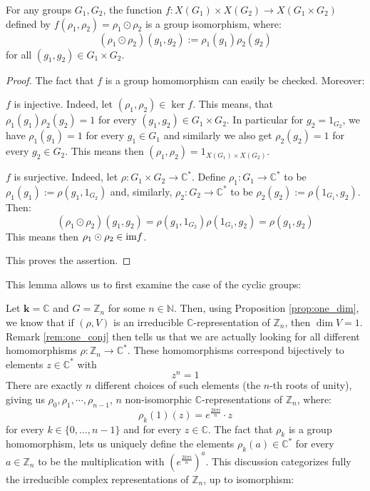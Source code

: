 \begin{lemma}\label{lem:grp_prod} For any groups $G_1,G_2$, the function $f:X(G_1)\times X(G_2)\to X(G_1\times G_2)$ defined by $f(\rho_1,\rho_2)=\rho_1\odot\rho_2$ is a group isomorphism, where:
$$(\rho_1\odot\rho_2)(g_1,g_2):=\rho_1(g_1)\rho_2(g_2)$$
for all $(g_1,g_2)\in G_1\times G_2$.
\end{lemma}
\begin{proof} The fact that $f$ is a group homomorphism can easily be checked. Moreover:\begin{i_enum}
\item $f$ is injective. Indeed, let $(\rho_1,\rho_2)\in\ker f$. This means, that $\rho_1(g_1)\rho_2(g_2)=1$ for every $(g_1,g_2)\in G_1\times G_2$. In particular for $g_2=1_{G_2}$, we have $\rho_1(g_1)=1$ for every $g_1\in G_1$ and similarly we also get $\rho_2(g_2)=1$ for every $g_2\in G_2$. This means then $(\rho_1,\rho_2)=1_{X(G_1)\times X(G_2)}$.
\item $f$ is surjective. Indeed, let $\rho:G_1\times G_2\to\mathbb{C}^*$. Define $\rho_1:G_1\to\mathbb{C}^*$ to be $\rho_1(g_1):=\rho(g_1,1_{G_2})$ and, similarly, $\rho_2:G_2\to\mathbb{C}^*$ to be $\rho_2(g_2):=\rho(1_{G_1},g_2)$. Then:
$$(\rho_1\odot\rho_2)(g_1,g_2)=\rho(g_1,1_{G_2})\rho(1_{G_1},g_2)=\rho(g_1,g_2)$$
This means then $\rho_1\odot\rho_2\in\mathrm{im } f$.
\end{i_enum}
This proves the assertion.
\end{proof}

This lemma allows us to first examine the case of the cyclic groups:
\begin{example} Let $\mathbf{k}=\mathbb{C}$ and $G=\mathbb{Z}_n$ for some $n\in\mathbb{N}$. Then, using Proposition \ref{prop:one_dim}, we know that if $(\rho,V)$ is an irreducible $\mathbb{C}$-representation of $\mathbb{Z}_n$, then $\dim V=1$. Remark \ref{rem:one_conj} then tells us that we are actually looking for all different homomorphisms $\rho:\mathbb{Z}_n\to\mathbb{C}^*$. These homomorphisms correspond bijectively to elements $z\in\mathbb{C}^*$ with
$$z^n=1$$
There are exactly $n$ different choices of such elements (the $n$-th roots of unity), giving us $\rho_0,\rho_1,\cdots,\rho_{n-1}$, $n$ non-isomorphic $\mathbb{C}$-representations of $\mathbb{Z}_n$, where:
$$\rho_k(1)(z)=e^{\frac{2k\pi i}{n}}\cdot z$$
for every $k\in\{0,\ldots,n-1\}$ and for every $z\in\mathbb{C}$. The fact that $\rho_k$ is a group homomorphism, lets us uniquely define the elements $\rho_k(a)\in\mathbb{C}^*$ for every $a\in\mathbb{Z}_n$ to be the multiplication with $\left(e^{\frac{2k\pi i}{n}}\right)^a$. This discussion categorizes fully the irreducible complex representations of $\mathbb{Z}_n$, up to isomorphism:
\end{example}

